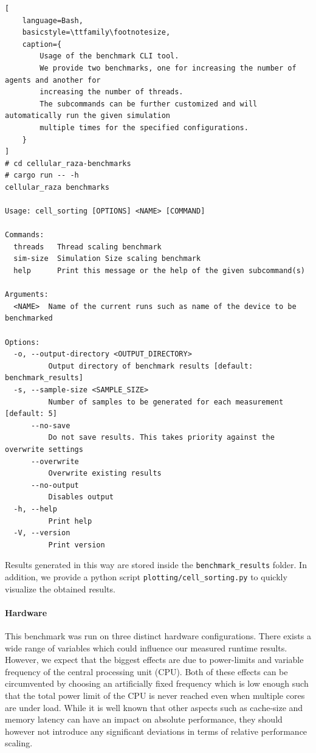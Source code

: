 \documentclass[fontsize=11pt,a4paper]{article}
\begin{document}
\begin{minipage}{\linewidth}\begin{lstlisting}[
    language=Bash,
    basicstyle=\ttfamily\footnotesize,
    caption={
        Usage of the benchmark CLI tool.
        We provide two benchmarks, one for increasing the number of agents and another for
        increasing the number of threads.
        The subcommands can be further customized and will automatically run the given simulation
        multiple times for the specified configurations.
    }
]
# cd cellular_raza-benchmarks
# cargo run -- -h
cellular_raza benchmarks

Usage: cell_sorting [OPTIONS] <NAME> [COMMAND]

Commands:
  threads   Thread scaling benchmark
  sim-size  Simulation Size scaling benchmark
  help      Print this message or the help of the given subcommand(s)

Arguments:
  <NAME>  Name of the current runs such as name of the device to be benchmarked

Options:
  -o, --output-directory <OUTPUT_DIRECTORY>
          Output directory of benchmark results [default: benchmark_results]
  -s, --sample-size <SAMPLE_SIZE>
          Number of samples to be generated for each measurement [default: 5]
      --no-save
          Do not save results. This takes priority against the overwrite settings
      --overwrite
          Overwrite existing results
      --no-output
          Disables output
  -h, --help
          Print help
  -V, --version
          Print version
\end{lstlisting}\end{minipage}

Results generated in this way are stored inside the \lstinline{benchmark_results} folder.
In addition, we provide a python script \lstinline{plotting/cell_sorting.py} to quickly visualize
the obtained results.

\paragraph{Hardware}
This benchmark was run on three distinct hardware configurations.
There exists a wide range of variables which could influence our measured runtime results.
However, we expect that the biggest effects are due to power-limits and variable frequency of the
central processing unit (CPU).
Both of these effects can be circumvented by choosing an artificially fixed frequency which is low
enough such that the total power limit of the CPU is never reached even when multiple cores are
under load.
While it is well known that other aspects such as cache-size and memory latency can have an impact
on absolute performance, they should however not introduce any significant deviations in terms of
relative performance scaling.
\end{document}
